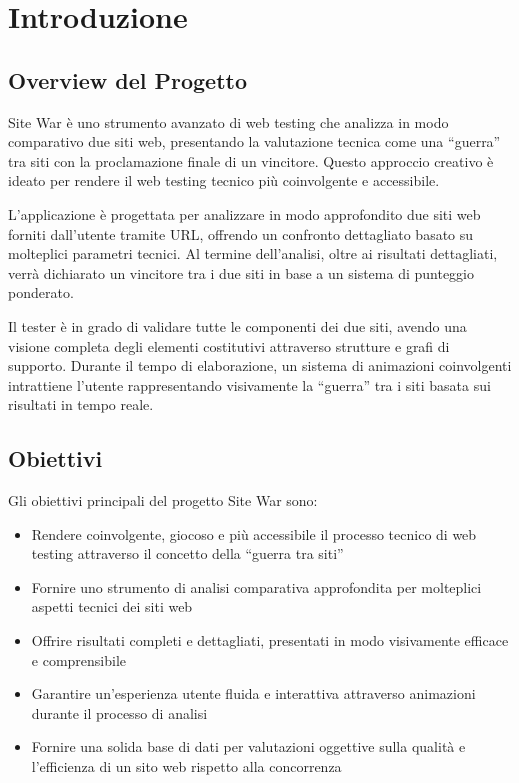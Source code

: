 \chapter{Introduzione}

\section{Overview del Progetto}
Site War è uno strumento avanzato di web testing che analizza in modo comparativo due siti web, presentando la valutazione tecnica come una ``guerra'' tra siti con la proclamazione finale di un vincitore. Questo approccio creativo è ideato per rendere il web testing tecnico più coinvolgente e accessibile.

L'applicazione è progettata per analizzare in modo approfondito due siti web forniti dall'utente tramite URL, offrendo un confronto dettagliato basato su molteplici parametri tecnici. Al termine dell'analisi, oltre ai risultati dettagliati, verrà dichiarato un vincitore tra i due siti in base a un sistema di punteggio ponderato.

Il tester è in grado di validare tutte le componenti dei due siti, avendo una visione completa degli elementi costitutivi attraverso strutture e grafi di supporto. Durante il tempo di elaborazione, un sistema di animazioni coinvolgenti intrattiene l'utente rappresentando visivamente la ``guerra'' tra i siti basata sui risultati in tempo reale.

\section{Obiettivi}
Gli obiettivi principali del progetto Site War sono:

\begin{itemize}
    \item Rendere coinvolgente, giocoso e più accessibile il processo tecnico di web testing attraverso il concetto della ``guerra tra siti''
    \item Fornire uno strumento di analisi comparativa approfondita per molteplici aspetti tecnici dei siti web
    \item Offrire risultati completi e dettagliati, presentati in modo visivamente efficace e comprensibile
    \item Garantire un'esperienza utente fluida e interattiva attraverso animazioni durante il processo di analisi
    \item Fornire una solida base di dati per valutazioni oggettive sulla qualità e l'efficienza di un sito web rispetto alla concorrenza
\end{itemize}

